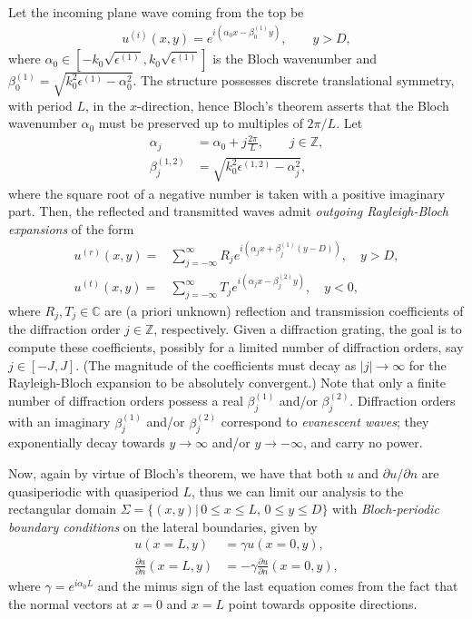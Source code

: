 \documentclass[reprint,amsmath,amssymb,
 aps]{revtex4-2}
\newcommand{\lf}{\left}
\newcommand{\rg}{\right}
\newcommand{\C}{\mathbb{C}}
\newcommand{\Z}{\mathbb{Z}}
\newcommand{\abs}[1]{\left|#1\right|}
\begin{document}
Let the incoming plane wave coming from the top be
\begin{align}
u^{(i)}(x,y) = e^{i(\alpha_0x - \beta_0^{(1)}y)},\qquad y > D, \label{eq:incident_wave}
\end{align}
where $\alpha_0 \in [-k_0\sqrt{\epsilon^{(1)}},k_0\sqrt{\epsilon^{(1)}}]$ is the Bloch wavenumber and $\beta_0^{(1)} = \sqrt{k_0^2\epsilon^{(1)}-\alpha_0^2}$. The structure possesses discrete translational symmetry, with period $L$, in the $x$-direction, hence Bloch's theorem asserts that the Bloch wavenumber $\alpha_0$ must be preserved up to multiples of $2\pi/L$. Let
\begin{align}
\alpha_j &= \alpha_0 + j \frac{2\pi}{L},\qquad j \in \Z,\\
\beta_j^{(1,2)} &= \sqrt{k_0^2\epsilon^{(1,2)}-\alpha_j^2},
\end{align}
where the square root of a negative number is taken with a positive imaginary part. Then, the reflected and transmitted waves admit \textit{outgoing Rayleigh-Bloch expansions} of the form 
\begin{align}
u^{(r)}(x,y) =& \sum\limits_{j=-\infty}^\infty R_je^{i\lf(\alpha_jx + \beta_j^{(1)}\left(y-D\right)\rg)},\quad y > D,\label{eq:refc}\\
u^{(t)}(x,y) =& \sum\limits_{j=-\infty}^\infty T_je^{i\lf(\alpha_jx - \beta_j^{(2)}y\rg)},\quad y < 0,\label{eq:transc}
\end{align}
where $R_j,T_j \in \C$ are (a priori unknown) reflection and transmission coefficients of the diffraction order $j\in\Z$, respectively. Given a diffraction grating, the goal is to compute these coefficients, possibly for a limited number of diffraction orders, say $j\in[-J,J]$. (The magnitude of the coefficients must decay as $\abs{j} \rightarrow \infty$ for the Rayleigh-Bloch expansion to be absolutely convergent.) Note that only a finite number of diffraction orders possess a real $\beta_j^{(1)}$ and/or $\beta_j^{(2)}$. Diffraction orders with an imaginary $\beta_j^{(1)}$ and/or $\beta_j^{(2)}$ correspond to \textit{evanescent waves}; they exponentially decay towards $y\rightarrow \infty$ and/or $y\rightarrow -\infty$, and carry no power.

Now, again by virtue of Bloch's theorem, we have that  both $u$ and $\partial u/ \partial n$ are quasiperiodic with quasiperiod $L$, thus we can limit our analysis to the rectangular domain $\Sigma = \{(x,y)|\,0\leq x\leq L,\, 0\leq y\leq D\}$ with \textit{Bloch-periodic boundary conditions} on the lateral boundaries, given by
\begin{align}
u(x=L,y) &= \gamma u(x=0,y), \label{eq:bloch1}\\
\frac{\partial u}{\partial n}(x=L,y) &= -\gamma \frac{\partial u}{\partial n}(x=0,y), \label{eq:bloch2}
\end{align}
where $\gamma = e^{i\alpha_0 L}$ and the minus sign of the last equation comes from the fact that the normal vectors at $x=0$ and $x=L$ point towards opposite directions.
\end{document}
